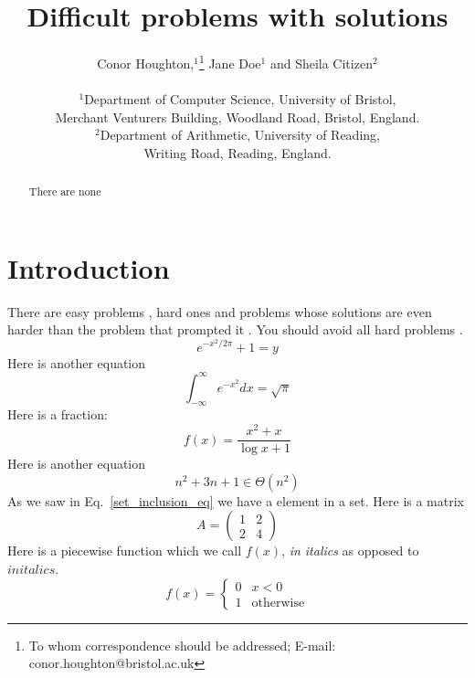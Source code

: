 \documentclass[11pt,a4paper]{scrartcl}
\begin{document}
\title{Difficult problems with solutions} 

\author
{Conor Houghton,$^{1}$\footnote{To whom correspondence should be addressed; E-mail:  conor.houghton@bristol.ac.uk} Jane Doe$^{1}$ and Sheila Citizen$^{2}$\\
\\
\normalsize{$^{1}$Department of Computer Science, University of Bristol,}\\
\normalsize{Merchant Venturers Building, Woodland Road, Bristol, England.}\\
\normalsize{$^{2}$Department of Arithmetic, University of Reading,}\\
\normalsize{Writing Road, Reading, England.}\\
}

\date{}

\maketitle


\begin{abstract}
There are none
\end{abstract}


\section{Introduction}
There are easy problems \cite{BrainBrainBrain1902a}, hard ones \cite{LightKnight2007a} and problems whose solutions are even harder than the problem that prompted it \cite{Swift1729a}. You should avoid all hard problems \cite{LightKnight2007a,Swift1729a}.
\begin{equation}
e^{-x^2/2\pi}+1=y
\end{equation}
Here is another equation
\begin{equation}
\int_{-\infty}^\infty e^{-x^2}dx=\sqrt{\pi}
\end{equation}
Here is a fraction:
\begin{equation}
f(x)=\frac{x^2+x}{\log{x}+1}
\end{equation}
Here is another equation
\begin{equation}\label{set_inclusion_eq}
n^2+3n+1\in \Theta(n^2)
\end{equation}
As we saw in Eq.~\ref{set_inclusion_eq} we have a element in a set.
Here is a matrix
\begin{equation}
A=\left(\begin{array}{cc}1&2\\2&4\end{array}\right)
\end{equation}
Here is a piecewise function which we call $f(x)$, \textsl{in italics} as opposed to $in italics$.
\begin{equation}
f(x)=\left\{\begin{array}{cl}0&x<0\\1&\mbox{otherwise}\end{array}\right.
\end{equation}







\end{document}
